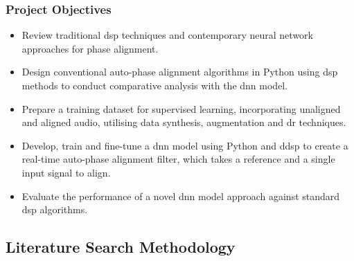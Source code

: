         \subsubsection{Project Objectives}
        \begin{itemize}
            \item{Review traditional \acrshort{dsp} techniques and contemporary neural network approaches for phase alignment.}
            \item{Design conventional auto-phase alignment algorithms in Python using \acrshort{dsp} methods to conduct comparative analysis with the \acrshort{dnn} model.}
            \item{Prepare a training dataset for supervised learning, incorporating unaligned and aligned audio, utilising data synthesis, augmentation and \acrfull{dr} techniques.}
            \item{Develop, train and fine-tune a \acrshort{dnn} model using Python and \acrshort{ddsp} to create a real-time auto-phase alignment filter, which takes a reference and a single input signal to align.}
            \item{Evaluate the performance of a novel \acrshort{dnn} model approach against standard \acrshort{dsp} algorithms.}
        \end{itemize}

    \subsection{Literature Search Methodology}

